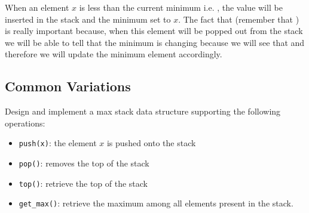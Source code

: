 When an element $x$ is less than the current minimum i.e. , the value  will be inserted in the stack and the minimum set to $x$. The fact that  (remember that ) is really important because, when this element will be popped out from the stack we will be able to tell that the minimum is changing because we will see that  and therefore we will update the minimum element accordingly.


\subsection{Common Variations}
\begin{exercise}
	 Design and implement a max stack data structure supporting the following operations:
	\begin{itemize}
		\item \lstinline[columns=fixed]{push(x)}: the element $x$ is pushed onto the stack
		\item \lstinline[columns=fixed]{pop()}: removes the top of the stack
		\item \lstinline[columns=fixed]{top()}: retrieve the top of the stack
		\item \lstinline[columns=fixed]{get_max()}: retrieve the maximum among all elements present in the stack.
	\end{itemize}

\end{exercise}